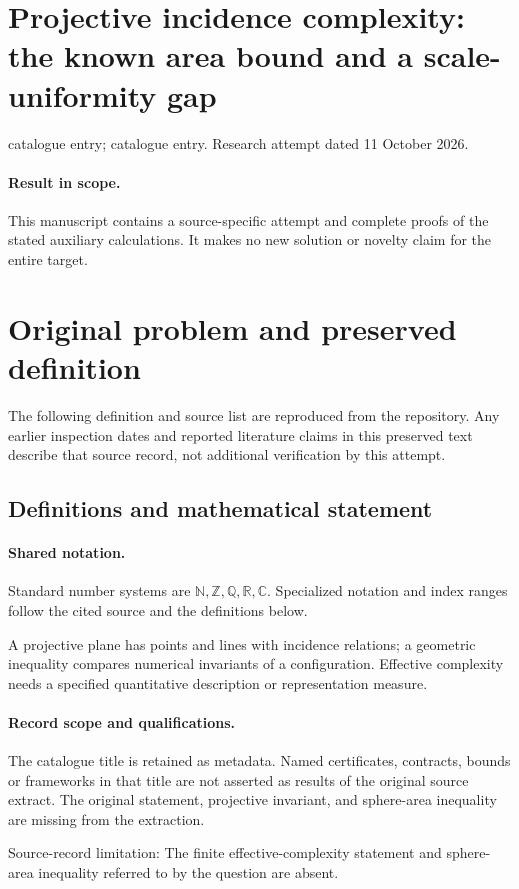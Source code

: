 \documentclass[11pt]{article}
\begin{document}
\section*{Projective incidence complexity: the known area bound and a scale-uniformity gap}
\noindent catalogue entry; catalogue entry. Research attempt dated 11 October 2026.
\paragraph{Result in scope.}This manuscript contains a source-specific attempt and complete proofs of the stated auxiliary calculations. It makes no new solution or novelty claim for the entire target.
\section{Original problem and preserved definition}
The following definition and source list are reproduced from the repository. Any earlier inspection dates and reported literature claims in this preserved text describe that source record, not additional verification by this attempt.
\subsection{Definitions and mathematical statement}

\paragraph{Shared notation.}Standard number systems are $\mathbb N,\mathbb Z,\mathbb Q,\mathbb R,\mathbb C$. Specialized notation and index ranges follow the cited source and the definitions below.


A projective plane has points and lines with incidence relations; a geometric inequality compares numerical invariants of a configuration. Effective complexity needs a specified quantitative description or representation measure.
\paragraph{Record scope and qualifications.}
The catalogue title is retained as metadata. Named certificates, contracts, bounds or frameworks in that title are not asserted as results of the original source extract.
The original statement, projective invariant, and sphere-area inequality are missing from the extraction.

Source-record limitation: The finite effective-complexity statement and sphere-area inequality referred to by the question are absent.
\end{document}
